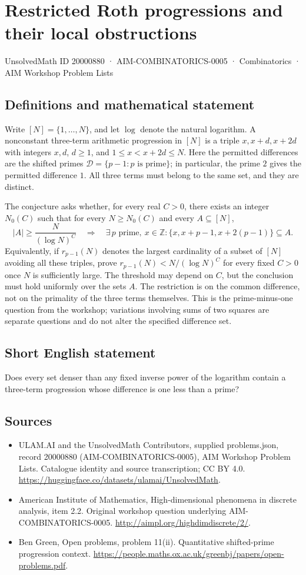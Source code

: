 \documentclass[11pt,a4paper]{article}
\begin{document}
\section*{Restricted Roth progressions and their local obstructions}\label{20000880}
{\small UnsolvedMath ID 20000880 · AIM-COMBINATORICS-0005 · Combinatorics · AIM Workshop Problem Lists}
\subsection{Definitions and mathematical statement}
Write $[N]=\{1,\ldots,N\}$, and let $\log$ denote the natural logarithm.
A nonconstant three-term arithmetic progression in $[N]$ is a triple
$x,x+d,x+2d$ with integers $x,d$, $d\geq1$, and $1\leq x<x+2d\leq N$.
Here the permitted differences are the shifted primes
$\mathcal D=\{p-1:p\text{ is prime}\}$; in particular, the prime $2$ gives the permitted difference $1$.
All three terms must belong to the same set, and they are distinct.

The conjecture asks whether, for every real $C>0$, there exists an integer $N_0(C)$ such that for every $N\geq N_0(C)$ and every $A\subseteq[N]$,
\[
 |A|\geq\frac{N}{(\log N)^C}
 \quad\Longrightarrow\quad
 \exists\,p\text{ prime},\ x\in\mathbb Z:
 \{x,x+p-1,x+2(p-1)\}\subseteq A.
\]
Equivalently, if $r_{p-1}(N)$ denotes the largest cardinality of a subset of $[N]$ avoiding all these triples, prove
$r_{p-1}(N)<N/(\log N)^C$ for every fixed $C>0$ once $N$ is sufficiently large.
The threshold may depend on $C$, but the conclusion must hold uniformly over the sets $A$.
The restriction is on the common difference, not on the primality of the three terms themselves.
This is the prime-minus-one question from the workshop; variations involving sums of two squares are separate questions and do not alter the specified difference set.
\subsection{Short English statement}
Does every set denser than any fixed inverse power of the logarithm contain a three-term progression whose difference is one less than a prime?
\subsection{Sources}
\begin{itemize}
\item[S1] ULAM.AI and the UnsolvedMath Contributors, supplied problems.json, record 20000880 (AIM-COMBINATORICS-0005), AIM Workshop Problem Lists. Catalogue identity and source transcription; CC BY 4.0.
\url{https://huggingface.co/datasets/ulamai/UnsolvedMath}.
\item[S2] American Institute of Mathematics, High-dimensional phenomena in discrete analysis, item 2.2. Original workshop question underlying AIM-COMBINATORICS-0005.
\url{http://aimpl.org/highdimdiscrete/2/}.
\item[S3] Ben Green, Open problems, problem 11(ii). Quantitative shifted-prime progression context.
\url{https://people.maths.ox.ac.uk/greenbj/papers/open-problems.pdf}.
\end{itemize}
\end{document}
